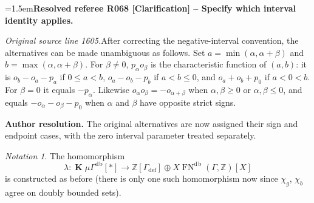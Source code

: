 \documentclass[12pt]{amsart}
\newcommand{\ResolvedRefereeRemark}[5]{%
  \par\medskip\begingroup\normalfont\small\color{gray}%
  \emergencystretch=1.5em\noindent\textbf{Resolved referee R#1 [#2] -- #3.}\par\nobreak\noindent #4\par
  \medskip\color{ResolutionGreen}\noindent\textbf{Author resolution.} #5\par
  \endgroup\medskip
}
\theoremstyle{plain}
\theoremstyle{definition}
\theoremstyle{remark}
\newtheorem{nota}[thm]{Notation}
\numberwithin{equation}{section}
\theoremstyle{plain}
\newcommand{\Z}{\mathds{Z}}
\newcommand{\0}{\emptyset}
\newcommand{\fun}{\longrightarrow}
\newcommand{\mG}{{\mu}{\Gamma}}
\DeclareMathOperator{\ggk}{\mathbf{K}}
\DeclareMathOperator{\fn}{FN}
\DeclareMathOperator{\db}{d \! b}
\begin{document}
\ResolvedRefereeRemark{068}{Clarification}{Specify which interval identity applies}{%
\textit{Original source line 1605.}\quad After correcting the negative-interval convention, the alternatives can be made unambiguous as follows. Set $a=\min(\alpha,\alpha+\beta)$ and $b=\max(\alpha,\alpha+\beta)$. For $\beta\neq0$, $p_\alpha o_\beta$ is the characteristic function of $(a,b)$: it is $o_b-o_a-p_a$ if $0\leq a<b$, $o_a-o_b-p_b$ if $a<b\leq0$, and $o_a+o_b+p_0$ if $a<0<b$. For $\beta=0$ it equals $-p_\alpha$. Likewise $o_\alpha o_\beta=-o_{\alpha+\beta}$ when $\alpha,\beta\geq0$ or $\alpha,\beta\leq0$, and equals $-o_\alpha-o_\beta-p_0$ when $\alpha$ and $\beta$ have opposite strict signs.
}{The original alternatives are now assigned their sign and endpoint cases, with the zero interval parameter treated separately.}

\begin{nota}\label{db:gam:fn}
The homomorphism
\begin{equation*}
\lambda : \ggk \mG^{\db}[*] \fun \Z[\Gamma_{\mathrm{def}}] \oplus X \fn^{\db}(\Gamma, \Z)[X]
\end{equation*}
is constructed as before (there is only one such homomorphism now since  $\chi_{g}$, $\chi_{b}$ agree on doubly bounded sets).
\end{nota}
\end{document}
